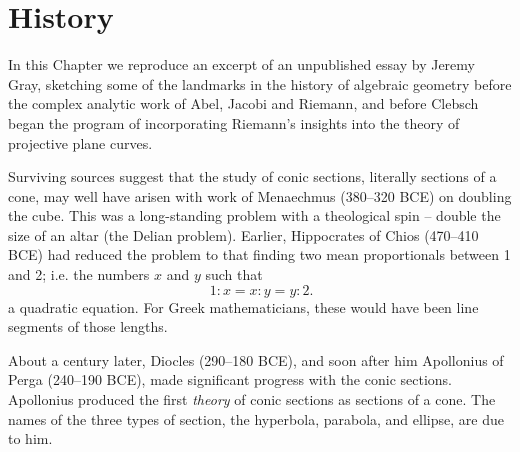 

\chapter{History} 
\label{History}

In this Chapter we reproduce an excerpt of an unpublished essay by Jeremy Gray, sketching some of the landmarks in the history of algebraic geometry before the complex analytic work of
Abel, Jacobi and Riemann, and before Clebsch began the program of incorporating Riemann's insights into the theory of projective plane curves.

Surviving sources suggest that the study of conic sections, literally sections of a cone, may well have arisen with work of Menaechmus (380--320 BCE) on doubling the cube. This was a long-standing problem with a theological spin -- double the size of an altar (the Delian problem).  Earlier, Hippocrates of Chios (470--410 BCE) had reduced the problem to that finding two mean proportionals between 1 and 2; i.e. the numbers $x$ and $y$ such that 
\begin{equation}~\label{Menmus}
1:x= x:y = y: 2.
\end{equation}
a quadratic equation.
For Greek mathematicians, these would have been line segments of those lengths. 


About a century later, Diocles (290--180 BCE), and soon after him Apollonius of Perga (240--190 BCE), made significant progress with the conic sections.
Apollonius produced the first \emph{theory} of conic sections as sections of a cone. The names of the three types of section, the hyperbola, parabola, and ellipse,  are due to him.

